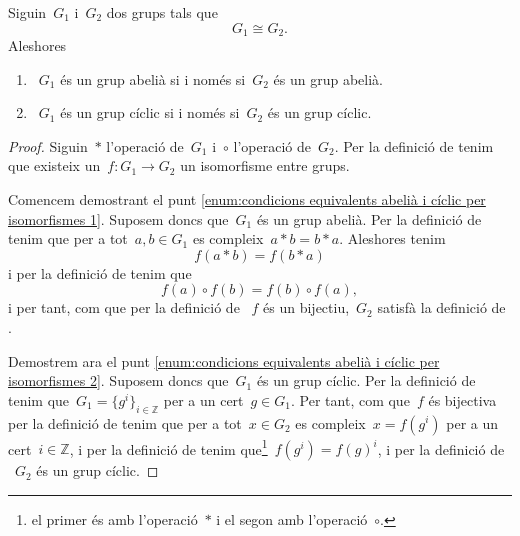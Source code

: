 \documentclass[../../main.tex]{subfiles}
\begin{document}
    \begin{proposition}
        \label{prop:condicions equivalents abelià i cíclic per isomorfismes}
        Siguin~\(G_{1}\) i~\(G_{2}\) dos grups tals que
        \[
            G_{1}\cong G_{2}.
        \]
        Aleshores
        \begin{enumerate}
            \item\label{enum:condicions equivalents abelià i cíclic per isomorfismes 1}~\(G_{1}\) és un grup abelià si i només si~\(G_{2}\) és un grup abelià.
            \item\label{enum:condicions equivalents abelià i cíclic per isomorfismes 2}~\(G_{1}\) és un grup cíclic si i només si~\(G_{2}\) és un grup cíclic.
        \end{enumerate}
        \begin{proof}
            Siguin~\(\ast\) l'operació de~\(G_{1}\) i~\(\circ\) l'operació de~\(G_{2}\).
            Per la definició de  tenim que existeix un~\(f\colon G_{1}\to G_{2}\) un isomorfisme entre grups.

            Comencem demostrant el punt \eqref{enum:condicions equivalents abelià i cíclic per isomorfismes 1}.
            Suposem doncs que~\(G_{1}\) és un grup abelià.
            Per la definició de  tenim que per a tot~\(a,b\in G_{1}\) es compleix~\(a\ast b=b\ast a\).
            Aleshores tenim
            \[
                f(a\ast b)=f(b\ast a)
            \]
            i per la definició de  tenim que
            \[
                f(a)\circ f(b)=f(b)\circ f(a),
            \]
            i per tant, com que per la definició de ~\(f\) és un bijectiu,~\(G_{2}\) satisfà la definició de .

            Demostrem ara el punt \eqref{enum:condicions equivalents abelià i cíclic per isomorfismes 2}.
            Suposem doncs que~\(G_{1}\) és un grup cíclic.
            Per la definició de  tenim que~\(G_{1}=\{g^{i}\}_{i\in\mathbb{Z}}\) per a un cert~\(g\in G_{1}\).
            Per tant, com que~\(f\) és bijectiva per la definició de  tenim que per a tot~\(x\in G_{2}\) es compleix~\(x=f(g^{i})\) per a un cert~\(i\in\mathbb{Z}\), i per la definició de  tenim que\footnote{el primer és amb l'operació~\(\ast\) i el segon amb l'operació~\(\circ\).}~\(f(g^{i})=f(g)^{i}\), i per la definició de ~\(G_{2}\) és un grup cíclic.
        \end{proof}
    \end{proposition}
\end{document}
